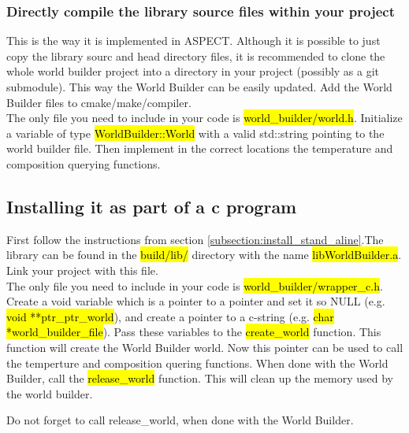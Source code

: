 \documentclass{book}
\newcommand{\WB}{{World Builder}}
\newcommand{\aspect}{{ASPECT}}
\begin{document}
\subsubsection{Directly compile the library source files within your project}
\label{subsubsection:direct_compile_library_source}
This is the way it is implemented in \aspect{}. Although it is possible to just copy the library sourc and head directory files, it is recommended to clone the whole world builder project into a directory in your project (possibly as a git submodule). This way the \WB{} can be easily updated. Add the \WB{} files to cmake/make/compiler. 
\\
The only file you need to include in your code is \hl{world\_builder/world.h}. Initialize a variable of type \hl{WorldBuilder::World} with a valid std::string pointing to the world builder file. Then implement in the correct locations the temperature and composition querying functions.
\subsection{Installing it as part of a c program}
First follow the instructions from section \ref{subsection:install_stand_aline}.The library can be found in the \hl{build/lib/} directory with the name \hl{libWorldBuilder.a}. Link your project with this file. 
\\
The only file you need to include in your code is \hl{world\_builder/wrapper\_c.h}. Create a void variable which is a pointer to a pointer and set it so NULL (e.g. \hl{void **ptr\_ptr\_world}), and create a pointer to a c-string (e.g. \hl{char *world\_builder\_file}). Pass these variables to the \hl{create\_world} function. This function will create the \WB{} world. Now this pointer can be used to call the temperture and composition quering functions. When done with the \WB{}, call the \hl{release\_world} function. This will clean up the memory used by the world builder.
\begin{remark}
Do not forget to call release\_world, when done with the \WB{}.
\end{remark}
\end{document}
